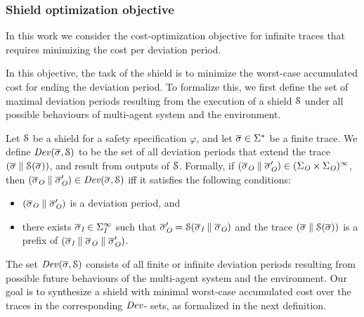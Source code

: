 \subsubsection{Shield optimization objective}


\iffalse MEAN-PAYOFF
In this work we consider two different cost-optimization objectives for infinite traces: (1) minimizing the cost per deviation period
and (2) minimizing the limit-average interference cost.
\fi
In this work we consider the cost-optimization objective for infinite traces that requires minimizing the cost per deviation period.

\iffalse MEAN-PAYOFF
\paragraph*{Minimizing the cost per deviation period}
\fi
In this objective, the task of the shield is to minimize the worst-case accumulated cost for ending the deviation period. To formalize this, we first define the set of maximal deviation periods resulting from the execution of a shield $\mathcal{S}$ under  all possible behaviours of multi-agent system and the environment.

\begin{defn}
Let $\mathcal{S}$ be a shield for a safety specification $\varphi$, and let $\overline\sigma \in \Sigma^*$ be a finite trace.
We define $\mathit{Dev} (\overline\sigma, \mathcal{S})$ to be the set of all deviation periods that extend the trace $(\overline\sigma\parallel\mathcal{S}(\overline\sigma))$, and result from outputs of $\mathcal{S}$.
Formally, if $(\overline\sigma_{\textit{O}}\parallel\overline\sigma_{\textit{O}}') \in (\Sigma_{\textit{O}}\times\Sigma_{\textit{O}})^\infty$, then
$(\overline\sigma_{\textit{O}}\parallel\overline\sigma_{\textit{O}}')  \in \mathit{Dev} (\overline\sigma, \mathcal{S})$ iff it satisfies the following conditions:
\begin{itemize}
\item $(\overline\sigma_{\textit{O}}\parallel\overline\sigma_{\textit{O}}')$ is a deviation period, and
\item there exists $\overline\sigma_{\textit{I}} \in \Sigma_{\textit{I}}^\infty$ such that
$\overline\sigma_{\textit{O}}'  = \mathcal{S}(\overline\sigma_{\textit{I}}\parallel\overline\sigma_{\textit{O}})$ and the trace
$(\overline\sigma\parallel\mathcal{S}(\overline\sigma))$ is a prefix of $(\overline\sigma_{\textit{I}}\parallel\overline\sigma_{\textit{O}}\parallel\overline\sigma_{\textit{O}}')$.
\end{itemize}
\end{defn}

The set $\mathit{Dev} (\overline\sigma, \mathcal{S})$ consists of all finite or infinite deviation periods resulting from possible future behaviours of the multi-agent system and the environment. Our goal is to synthesize a shield with minimal worst-case accumulated cost over the traces in the corresponding $\mathit{Dev}$- sets, as formalized in the next definition.


